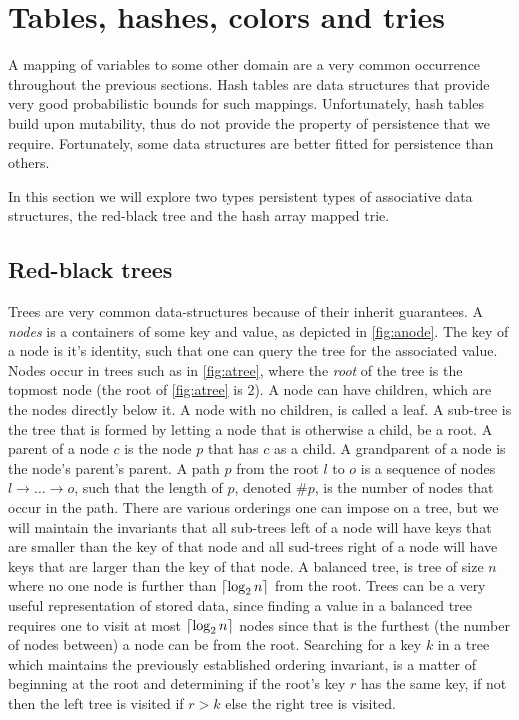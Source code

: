 \section{Tables, hashes, colors and tries}
A mapping of variables to some other domain are a very common occurrence throughout the previous sections.
Hash tables are data structures that provide very good probabilistic bounds for such mappings.
Unfortunately, hash tables build upon mutability, thus do not provide the property of persistence that we require.
Fortunately, some data structures are better fitted for persistence than others.

In this section we will explore two types persistent types of associative data structures, the red-black tree and the hash array mapped trie.

\subsection{Red-black trees}
Trees are very common data-structures because of their inherit guarantees.
A \textit{nodes} is a containers of some key and value, as depicted in \autoref{fig:anode}.
The key of a node is it's identity, such that one can query the tree for the associated value.
Nodes occur in trees such as in \autoref{fig:atree}, where the \textit{root} of the tree is the topmost node (the root of \autoref{fig:atree} is $2$).
A node can have children, which are the nodes directly below it.
A node with no children, is called a leaf.
A sub-tree is the tree that is formed by letting a node that is otherwise a child, be a root.
A parent of a node $c$ is the node $p$ that has $c$ as a child.
A grandparent of a node is the node's parent's parent.
A path $p$ from the root $l$ to $o$ is a sequence of nodes $l \rightarrow \dots \rightarrow o$, such that the length of $p$, denoted $\#p$, is the number of nodes that occur in the path.
There are various orderings one can impose on a tree, but we will maintain the invariants that all sub-trees left of a node will have keys that are smaller than the key of that node and all sud-trees right of a node will have keys that are larger than the key of that node.
A balanced tree, is tree of size $n$ where no one node is further than $\lceil\log_2 n\rceil$ from the root.
Trees can be a very useful representation of stored data, since finding a value in a balanced tree requires one to visit at most $\lceil\log_2 n\rceil$ nodes since that is the furthest (the number of nodes between) a node can be from the root.
Searching for a key $k$ in a tree which maintains the previously established ordering invariant, is a matter of beginning at the root and determining if the root's key $r$ has the same key, if not then the left tree is visited if $r > k$ else the right tree is visited.
